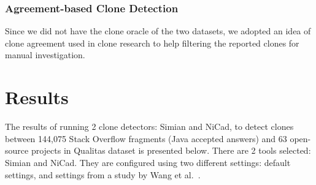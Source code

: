\documentclass{sig-alternate-05-2015}
\begin{document}
\subsubsection{Agreement-based Clone Detection}
Since we did not have the clone oracle of the two datasets, we adopted an idea of clone agreement used in clone research \cite{Wang2013,Funaro2010} to help filtering the reported clones for manual investigation.

\section{Results}
The results of running 2 clone detectors: Simian and NiCad, to detect clones between 144,075 Stack Overflow fragments (Java accepted answers) and 63 open-source projects in Qualitas dataset is presented below. There are 2 tools selected: Simian and NiCad. They are configured using two different settings: default settings, and settings from a study by Wang et al.~\cite{Wang2013}. %
\end{document}
